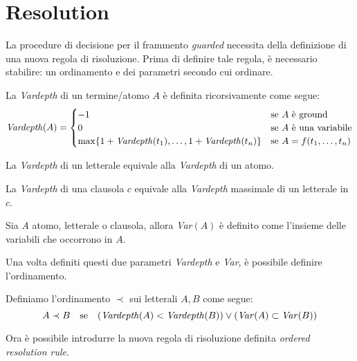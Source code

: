 \section{Resolution}
La procedure di decisione per il frammento \emph{guarded} necessita della definizione di una nuova regola di risoluzione.
Prima di definire tale regola, è necessario stabilire: un ordinamento e dei parametri secondo cui ordinare.
\begin{definition}\label{var-def}
    La \emph{Vardepth} di un termine/atomo $A$ è definita ricorsivamente come segue:
    \[\text{\emph{Vardepth}}(A) = 
    \begin{cases}
        -1 & \text{se $A$ è ground}\\
        0 & \text{se $A$ è una variabile}\\
        \max\{1+\text{\emph{Vardepth}}(t_1), \dots, 1+\text{\emph{Vardepth}}(t_n)\} & \text{se }A=f(t_1,\dots,t_n)
    \end{cases}\]
\end{definition}
\begin{definition}
    La \emph{Vardepth} di un letterale equivale alla \emph{Vardepth} di un atomo.
\end{definition}
\begin{definition}
    La \emph{Vardepth} di una clausola $c$ equivale alla \emph{Vardepth} massimale di un letterale in $c$. 
\end{definition}
\begin{definition}
    Sia $A$ atomo, letterale o clausola, allora \emph{Var}$(A)$ è definito come l'insieme delle 
    variabili che occorrono in $A$.
\end{definition}
Una volta definiti questi due parametri \emph{Vardepth} e \emph{Var}, è possibile definire l'ordinamento.
\begin{definition}\label{ord-def}
    Definiamo l'ordinamento $\prec$ sui letterali $A,B$ come segue:
    \[A\prec B \quad\text{se}\quad(\text{\emph{Vardepth}}(A)<\text{\emph{Vardepth}}(B)) \lor (\text{\emph{Var}}(A)\subset\text{\emph{Var}}(B))\]
\end{definition}
Ora è possibile introdurre la nuova regola di risoluzione definita \emph{ordered resolution rule}.
